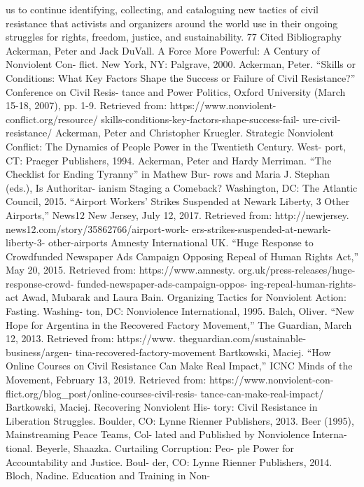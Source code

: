 \documentclass[twoside,a4paper,12pt,fleqn,openany]{extbook}
\begin{document}
us to continue identifying, collecting, and cataloguing new tactics of civil resistance that
activists and organizers around the world use in their ongoing struggles for rights, freedom,
justice, and sustainability.
77
Cited Bibliography
Ackerman, Peter and Jack DuVall. A Force
More Powerful: A Century of Nonviolent Con-
flict. New York, NY: Palgrave, 2000.
Ackerman, Peter. “Skills or Conditions: What
Key Factors Shape the Success or Failure of
Civil Resistance?” Conference on Civil Resis-
tance and Power Politics, Oxford University
(March 15-18, 2007), pp. 1-9. Retrieved from:
https://www.nonviolent-conflict.org/resource/
skills-conditions-key-factors-shape-success-fail-
ure-civil-resistance/
Ackerman, Peter and Christopher Kruegler.
Strategic Nonviolent Conflict: The Dynamics of
People Power in the Twentieth Century. West-
port, CT: Praeger Publishers, 1994.
Ackerman, Peter and Hardy Merriman. “The
Checklist for Ending Tyranny” in Mathew Bur-
rows and Maria J. Stephan (eds.), Is Authoritar-
ianism Staging a Comeback? Washington, DC:
The Atlantic Council, 2015.
“Airport Workers’ Strikes Suspended at Newark
Liberty, 3 Other Airports,” News12 New Jersey,
July 12, 2017. Retrieved from: http://newjersey.
news12.com/story/35862766/airport-work-
ers-strikes-suspended-at-newark-liberty-3-
other-airports
Amnesty International UK. “Huge Response to
Crowdfunded Newspaper Ads Campaign
Opposing Repeal of Human Rights Act,” May
20, 2015. Retrieved from: https://www.amnesty.
org.uk/press-releases/huge-response-crowd-
funded-newspaper-ads-campaign-oppos-
ing-repeal-human-rights-act
Awad, Mubarak and Laura Bain. Organizing
Tactics for Nonviolent Action: Fasting. Washing-
ton, DC: Nonviolence International, 1995.
Balch, Oliver. “New Hope for Argentina in the
Recovered Factory Movement,” The Guardian,
March 12, 2013. Retrieved from: https://www.
theguardian.com/sustainable-business/argen-
tina-recovered-factory-movement
Bartkowski, Maciej. “How Online Courses on
Civil Resistance Can Make Real Impact,” ICNC
Minds of the Movement, February 13, 2019.
Retrieved from: https://www.nonviolent-con-
flict.org/blog_post/online-courses-civil-resis-
tance-can-make-real-impact/
Bartkowski, Maciej. Recovering Nonviolent His-
tory: Civil Resistance in Liberation Struggles.
Boulder, CO: Lynne Rienner Publishers, 2013.
Beer (1995), Mainstreaming Peace Teams, Col-
lated and Published by Nonviolence Interna-
tional.
Beyerle, Shaazka. Curtailing Corruption: Peo-
ple Power for Accountability and Justice. Boul-
der, CO: Lynne Rienner Publishers, 2014.
Bloch, Nadine. Education and Training in Non-
\end{document}

